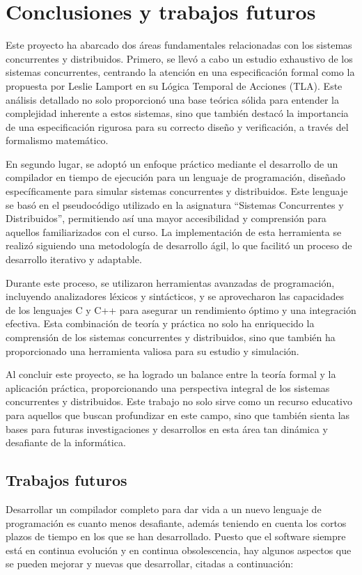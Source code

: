 \chapter{\textbf{Conclusiones y trabajos futuros}}

Este proyecto ha abarcado dos áreas fundamentales relacionadas con los sistemas concurrentes y distribuidos. Primero, se llevó a cabo un estudio exhaustivo de los sistemas concurrentes, centrando la atención en una especificación formal como la propuesta por Leslie Lamport en su Lógica Temporal de Acciones (TLA). Este análisis detallado no solo proporcionó una base teórica sólida para entender la complejidad inherente a estos sistemas, sino que también destacó la importancia de una especificación rigurosa para su correcto diseño y verificación, a través del formalismo matemático.

En segundo lugar, se adoptó un enfoque práctico mediante el desarrollo de un compilador en tiempo de ejecución para un lenguaje de programación, diseñado específicamente para simular sistemas concurrentes y distribuidos. Este lenguaje se basó en el pseudocódigo utilizado en la asignatura ``Sistemas Concurrentes y Distribuidos'', permitiendo así una mayor accesibilidad y comprensión para aquellos familiarizados con el curso. La implementación de esta herramienta se realizó siguiendo una metodología de desarrollo ágil, lo que facilitó un proceso de desarrollo iterativo y adaptable.

Durante este proceso, se utilizaron herramientas avanzadas de programación, incluyendo analizadores léxicos y sintácticos, y se aprovecharon las capacidades de los lenguajes C y C++ para asegurar un rendimiento óptimo y una integración efectiva. Esta combinación de teoría y práctica no solo ha enriquecido la comprensión de los sistemas concurrentes y distribuidos, sino que también ha proporcionado una herramienta valiosa para su estudio y simulación.

Al concluir este proyecto, se ha logrado un balance entre la teoría formal y la aplicación práctica, proporcionando una perspectiva integral de los sistemas concurrentes y distribuidos. Este trabajo no solo sirve como un recurso educativo para aquellos que buscan profundizar en este campo, sino que también sienta las bases para futuras investigaciones y desarrollos en esta área tan dinámica y desafiante de la informática.

\section{Trabajos futuros}
Desarrollar un compilador completo para dar vida a un nuevo lenguaje de programación es cuanto menos desafiante, además teniendo en cuenta los cortos plazos de tiempo en los que se han desarrollado. Puesto que el software siempre está en continua evolución y en continua obsolescencia, hay algunos aspectos que se pueden mejorar y nuevas que desarrollar, citadas a continuación:


